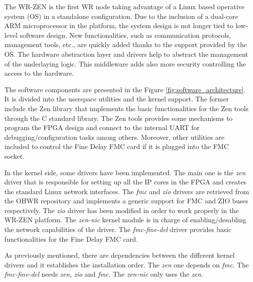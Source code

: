 The WR-ZEN is the first WR node taking advantage of a Linux based operative
system (OS) in a standalone configuration. Due to the inclusion of a dual-core
ARM microprocessor in the platform, the system design is not longer tied to
low-level software design. New functionalities, such as communication
protocols, management tools, etc., are quickly added thanks to the support
provided by the OS. The hardware abstraction layer and drivers help to abstract
the management of the underlaying logic. This middleware adds also more
security controlling the access to the hardware.

The software components are presented in the Figure
\ref{fig:software_architecture}.  It is divided into the userspace utilities
and the kernel support.  The former include the Zen library that implements the
basic functionalities for the Zen tools through the C standard library. The Zen
tools provides some mechanisms to program the FPGA design and connect to the
internal UART for debugging/configuration tasks among others.  Moreover, other
utilities are included to control the Fine Delay FMC card if it is plugged into
the FMC socket.

In the kernel side, some drivers have been implemented. The main one is the
\textit{zen} driver that is responsible for setting up all the IP cores in the
FPGA and creates the standard Linux network interfaces. The \textit{fmc} and
\textit{zio} drivers are retrieved from the OHWR repository and implements a
generic support for FMC and ZIO buses respectively.  The \textit{zio} driver
has been modified in order to work properly in the WR-ZEN platform.  The
\textit{zen-nic} kernel module is in charge of enabling/desabling the network
capabilities of the  driver. The \textit{fmc-fine-del} driver
provides basic functionalities for the Fine Delay FMC card.

As previously mentioned, there are dependencies between the different kernel
drivers and it establishes the installation order. The \textit{zen} one depends
on \textit{fmc}. The \textit{fmc-fine-del} needs \textit{zen}, \textit{zio} and
\textit{fmc}. The \textit{zen-nic} only uses the \textit{zen}.

